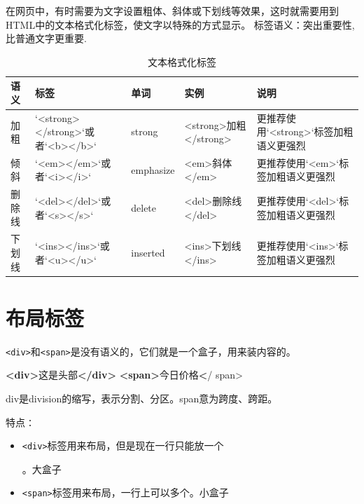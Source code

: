 \documentclass[
]{book}
\newenvironment{Shaded}{\begin{snugshade}}{\end{snugshade}}
\newcommand{\ErrorTok}[1]{\textcolor[rgb]{0.64,0.00,0.00}{\textbf{#1}}}
\newcommand{\KeywordTok}[1]{\textcolor[rgb]{0.13,0.29,0.53}{\textbf{#1}}}
\newcommand{\NormalTok}[1]{#1}
\providecommand{\tightlist}{%
  \setlength{\itemsep}{0pt}\setlength{\parskip}{0pt}}
\begin{document}
在网页中，有时需要为文字设置粗体、斜体或下划线等效果，这时就需要用到HTML中的文本格式化标签，使文字以特殊的方式显示。
标签语义：突出重要性,比普通文字更重要.

\begin{table}

\caption{\label{tab:unnamed-chunk-6}文本格式化标签}
\centering
\begin{tabular}[t]{lllll}
\toprule
语义 & 标签 & 单词 & 实例 & 说明\\
\midrule
加粗 & `<strong></strong>`或者`<b></b>` & strong & <strong>加粗</strong> & 更推荐使用`<strong>`标签加粗语义更强烈\\
倾斜 & `<em></em>`或者`<i></i>` & emphasize & <em>斜体</em> & 更推荐使用`<em>`标签加粗语义更强烈\\
删除线 & `<del></del>`或者`<s></s>` & delete & <del>删除线</del> & 更推荐使用`<del>`标签加粗语义更强烈\\
下划线 & `<ins></ins>`或者`<u></u>` & inserted & <ins>下划线</ins> & 更推荐使用`<ins>`标签加粗语义更强烈\\
\bottomrule
\end{tabular}
\end{table}

\hypertarget{ux5e03ux5c40ux6807ux7b7e}{%
\section{布局标签}\label{ux5e03ux5c40ux6807ux7b7e}}

\texttt{\textless{}div\textgreater{}}和\texttt{\textless{}span\textgreater{}}是没有语义的，它们就是一个盒子，用来装内容的。

\begin{Shaded}
\begin{Highlighting}[]
\KeywordTok{\textless{}div\textgreater{}}\NormalTok{这是头部}\KeywordTok{\textless{}/div\textgreater{}}
\KeywordTok{\textless{}span\textgreater{}}\NormalTok{今日价格}\ErrorTok{\textless{}}\NormalTok{/ span\textgreater{}}
\end{Highlighting}
\end{Shaded}

div是division的缩写，表示分割、分区。span意为跨度、跨距。

特点∶

\begin{itemize}
\tightlist
\item
  \texttt{\textless{}div\textgreater{}}标签用来布局，但是现在一行只能放一个

  。大盒子
\item
  \texttt{\textless{}span\textgreater{}}标签用来布局，一行上可以多个。小盒子
\end{itemize}
\end{document}
